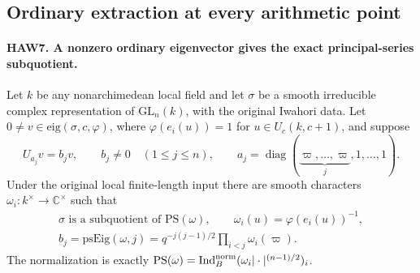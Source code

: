 \documentclass[11pt,a4paper]{article}
\numberwithin{equation}{section}
\theoremstyle{remark}\newtheorem{remark}[theorem]{Remark}
\begin{document}
\subsection{Ordinary extraction at every arithmetic point}

\paragraph{HAW7. A nonzero ordinary eigenvector gives the exact principal-series subquotient.}
\label{claim:HAW7}
Let $k$ be any nonarchimedean local field and let $\sigma$ be
a smooth irreducible complex representation of
$\mathrm{GL}_n(k)$, with the original Iwahori data.  Let
$0\ne v\in\mathrm{eig}(\sigma,c,\varphi)$, where
$\varphi(e_i(u))=1$ for $u\in U_c(k,c+1)$, and suppose
\[
 U_{a_j}v=b_jv,\qquad b_j\ne0\quad(1\le j\le n),\qquad
 a_j=\operatorname{diag}(\underbrace{\varpi,\ldots,\varpi}_j,1,\ldots,1).
 \tag{HAW.10}
\]
Under the original local finite-length input there are smooth
characters $\omega_i:k^\times\to\mathbb C^\times$ such that
\[
 \begin{gathered}
 \sigma\text{ is a subquotient of }\mathrm{PS}(\omega),\qquad
 \omega_i(u)=\varphi(e_i(u))^{-1},\\
 b_j=\mathrm{psEig}(\omega,j)
       =q^{-j(j-1)/2}\prod_{i<j}\omega_i(\varpi).
 \end{gathered}
 \tag{HAW.11}
\]
The normalization is exactly
$\mathrm{PS}(\omega)=\operatorname{Ind}^{\rm norm}_B
(\omega_i|\cdot|^{(n-1)/2})_i$.
\end{document}
